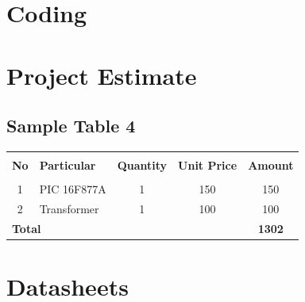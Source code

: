 \documentclass[12pt,a4paper]{report}
\begin{document}
\begin{appendices}
\chapter{Coding}

\newpage

\chapter{Project Estimate}
\section{Sample Table 4}

\begin{table}[h]
\begin{center}
\begin{tabular}{|c|l|c|c|c|}
 \hline
   &                          &          &            &        \\ 
 \textbf{No} & \textbf{Particular} & \textbf{Quantity} & \textbf{Unit Price} & \textbf{Amount} \\ 
   &                          &          &            &        \\ \hline
1  & PIC 16F877A              & 1        & 150        & 150    \\ \hline
2  & Transformer              & 1        & 100        & 100    \\ \hline
\multicolumn{4}{|l}{\textbf{Total}}               \vline              & \textbf{1302} \\  \hline    
\end{tabular}
\end{center}
\end{table}


\chapter{Datasheets}

\end{appendices}
\end{document}
